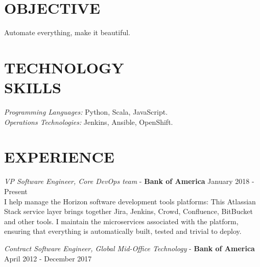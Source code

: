 \documentclass[margin, 10pt]{res} %
\begin{document}
    \begin{resume}


        \section{OBJECTIVE}

        Automate everything, make it beautiful.


        \section{TECHNOLOGY \\ SKILLS}

        {\sl Programming Languages:} Python, Scala, JavaScript. \\
        {\sl Operations Technologies:} Jenkins, Ansible, OpenShift. \\


        \section{EXPERIENCE}

        {\sl VP Software Engineer, Core DevOps team} - \textbf{Bank of America} \hfill January 2018 - Present \\

        I help manage the Horizon software development tools platforms: This Atlassian Stack service layer
        brings together Jira, Jenkins, Crowd, Confluence, BitBucket and other tools. I maintain the
        microservices associated with the platform, ensuring that everything is automatically built,
        tested and trivial to deploy.

        {\sl Contract Software Engineer, Global Mid-Office Technology} - \textbf{Bank of America} \hfill April 2012 - December 2017 \\


\end{resume}
\end{document}
